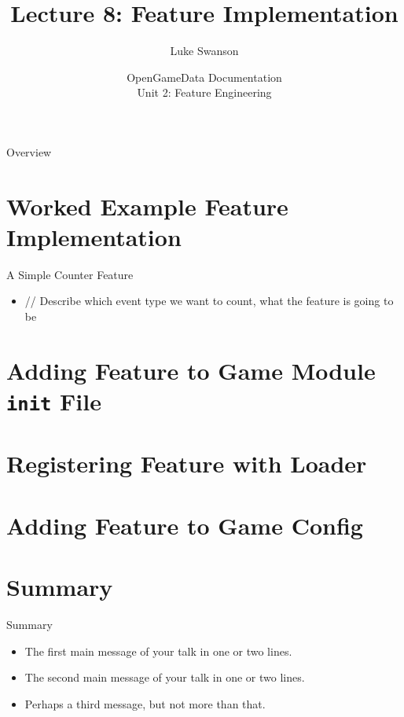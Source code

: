 \documentclass{beamer}
\title[Feature Implementation] %
{Lecture 8: Feature Implementation}
\author[Swanson] %
{Luke Swanson}
\institute[University of Wisconsin-Madison] %
{
  Field Day Lab\\
  University of Wisconsin-Madison
}
\date[OGD Docs] %
{OpenGameData Documentation \\ Unit 2: Feature Engineering}
\begin{document}
\begin{frame}
  \titlepage
\end{frame}

\begin{frame}{Overview}
  \tableofcontents
\end{frame}


\section[Worked Example]{Worked Example Feature Implementation}

\begin{frame}{A Simple Counter Feature}
  \begin{itemize}
  \item
    // Describe which event type we want to count, what the feature is going to be
    \pause
  \end{itemize}
\end{frame}

\section[\textunderscore\textunderscore{}init\textunderscore\textunderscore{} File]{Adding Feature to Game Module \texttt{\textunderscore\textunderscore{}init\textunderscore\textunderscore{}} File}

\section[Feature Loader]{Registering Feature with Loader}

\section[Feature Config]{Adding Feature to Game Config}

\section*{Summary}

\begin{frame}{Summary}
  \begin{itemize}
  \item
    The \alert{first main message} of your talk in one or two lines.
  \item
    The \alert{second main message} of your talk in one or two lines.
  \item
    Perhaps a \alert{third message}, but not more than that.
  \end{itemize}
\end{frame}
\end{document}
